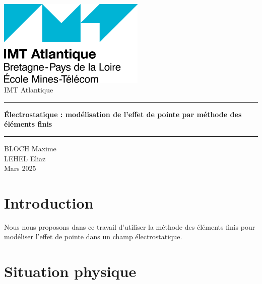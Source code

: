 \documentclass{article}
\begin{document}
\begin{titlepage}
    \begin{titlepage}      
        \begin{center}
            \includegraphics[width=7cm]{img/Logo_IMT_Atlantique.png}
            \\[1.9cm]
            {\LARGE IMT Atlantique}\\[1.5cm]
            
			{\color{black} \rule{\textwidth}{1pt}}

            \linespread{1.2}
            \vspace{0.5cm}
            \huge {\textbf{Électrostatique : modélisation de l'effet de pointe
             par méthode des éléments finis}}
            \vspace{1cm}
            \linespread{1.2}
			{\color{black} \rule{\textwidth}{1pt}}
            \Large {BLOCH Maxime} \\
            \Large {LEHEL Eliaz} \\[1cm]
            \Large {Mars 2025}
            
        \end{center}
    \end{titlepage}
\end{titlepage}

\section*{Introduction}

\hspace{1cm}
Nous nous proposons dans ce travail d'utiliser la méthode des éléments finis
pour modéliser l'effet de pointe dans un champ électrostatique.

\section{Situation physique}
\end{document}
